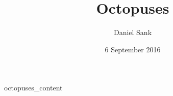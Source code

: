 \documentclass{article}
\title{Octopuses}
\author{Daniel Sank}
\date{6 September 2016}
\begin{document}
\maketitle
{octopuses_content}
\end{document}

